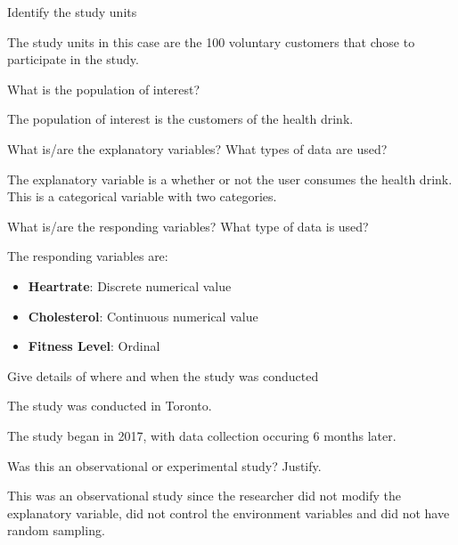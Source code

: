 \documentclass{article}
\theoremstyle{plain}
\theoremstyle{definition}
\theoremstyle{definition}
\begin{document}
\begin{question}
    Identify the study units
\end{question}

\begin{answer}
    The study units in this case are the 100 voluntary customers that chose to participate in the study.
\end{answer}

\begin{question}
    What is the population of interest?
\end{question}

\begin{answer}
    The population of interest is the customers of the health drink.
\end{answer}

\begin{question}
    What is/are the explanatory variables? What types of data are used?
\end{question}
\begin{answer}
    The explanatory variable is a whether or not the user consumes the health drink. This is a categorical variable with two categories.
\end{answer}

\begin{question}
    What is/are the responding variables? What type of data is used?
\end{question}
\begin{answer}
    The responding variables are:
    \begin{itemize}
        \item \textbf{Heartrate}: Discrete numerical value
        \item \textbf{Cholesterol}: Continuous numerical value
        \item \textbf{Fitness Level}: Ordinal
    \end{itemize}
\end{answer}

\begin{question}
    Give details of where and when the study was conducted
\end{question}
\begin{answer}
    The study was conducted in Toronto.
    
    The study began in 2017, with data collection occuring 6 months later.
\end{answer}

\begin{question}
    Was this an observational or experimental study? Justify.
\end{question}
\begin{answer}
    This was an observational study since the researcher did not modify the explanatory variable, did not control the environment variables and did not have random sampling.
\end{answer}
\end{document}
